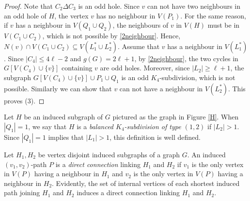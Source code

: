 \documentclass[11pt]{article}
\begin{document}
\begin{proof}
Note that $C_2\Delta C_3$ is an odd hole. Since $v$ can not have two neighbours in an odd hole of $H$, the vertex $v$ has no neighbour in $V(P_1)$. For the same reason, if $v$ has a neighbour in $V(Q_1\cup Q_2)$, the neighbours of $v$ in $V(H)$ must be in $V(C_1\cup C_2)$, which is not possible by \ref{2neighbour}. Hence, $N(v)\cap V(C_1\cup C_2)\subseteq V(L^*_1\cup L^*_2)$. Assume that $v$ has a neighbour in $V(L^*_1)$. Since $|C_4|\leq 4\ell-2$ and $g(G)=2\ell+1$, by \ref{2neighbour}, the two cycles in $G[V(C_4)\cup\{v\}]$ containing $v$ are odd holes. Moreover, since $|L_2|\geq\ell+1$, the subgraph $G[V(C_4)\cup\{v\}]\cup P_1\cup Q_1$ is an odd  $K_4$-subdivision, which is not possible. Similarly we can show that $v$ can not have a neighbour in $V(L^*_2)$. This proves (3). 
\end{proof}

Let $H$ be an induced subgraph of $G$ pictured as the graph in Figure \ref{H}. When $|Q_1|=1$, we say that $H$ is a {\em balanced $K_4$-subdivision of type $(1,2)$} if $|L_2|>1$. Since $|Q_1|=1$ implies that $|L_1|>1$, this definition is well defined.

Let $H_1,H_2$ be vertex disjoint induced subgraphs of a graph $G$.  An induced $(v_1,v_2)$-path $P$ is a {\em direct connection} linking $H_1$ and $H_2$ if $v_1$ is the only vertex in $V(P)$ having a neighbour in $H_1$ and $v_2$ is the only vertex in $V(P)$ having a neighbour in $H_2$. Evidently, the set of internal vertices of each shortest induced path joining $H_1$ and $H_2$ induces a direct connection linking $H_1$ and $H_2$.
\end{document}
